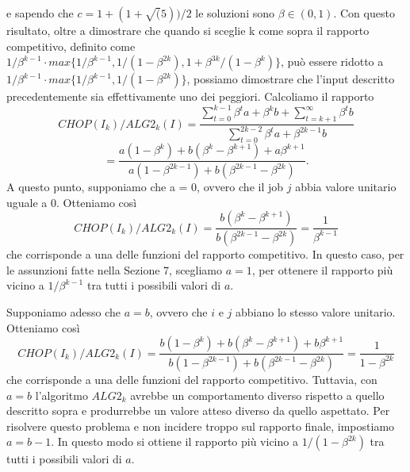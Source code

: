 \documentclass[12pt]{article}
\begin{document}
e sapendo che $c=1 + (1 + \sqrt(5))/2$ le soluzioni sono $\beta \in (0,1)$. Con questo risultato, oltre a dimostrare che quando si sceglie k come sopra il rapporto competitivo, definito come $1/\beta^{k-1} \cdot max \{1 / \beta^{k - 1}, 1 / (1 - \beta^{2k}), 1 + \beta^{3k} / (1 - \beta^{k})\}$, può essere ridotto a $1/\beta^{k-1} \cdot max \{1 / \beta^{k - 1}, 1 / (1 - \beta^{2k})\}$, possiamo dimostrare che l'input  descritto precedentemente sia effettivamente uno dei peggiori. Calcoliamo il rapporto $$CHOP(I_{k}) / ALG2_{k}(I) = \frac{ \sum_{t = 0}^{k-1}\beta^{t}a + \beta^{k} b + \sum_{t=k+1}^{\infty}\beta^{t}b}{\sum_{t=0}^{2k-2}\beta^{t}a + \beta^{2k-1}b}$$ $$= \frac{a(1 - \beta^{k}) + b(\beta^{k} - \beta^{k+1}) + a\beta^{k+1}}{a(1 - \beta^{2k-1}) + b(\beta^{2k-1}-\beta^{2k})}.$$
A questo punto, supponiamo che a = 0, ovvero che il job $j$ abbia valore unitario uguale a 0. Otteniamo così $$CHOP(I_{k}) / ALG2_{k}(I) = \frac{b(\beta^{k} - \beta^{k+1})}{b(\beta^{2k-1}-\beta^{2k})} = \frac{1}{\beta^{k-1}}$$ che corrisponde a una delle funzioni del rapporto competitivo. In questo caso, per le assunzioni fatte nella Sezione 7, scegliamo $a = 1$, per ottenere il rapporto più vicino a $1/\beta^{k-1}$ tra tutti i possibili valori di $a$.

Supponiamo adesso che $a = b$, ovvero che $i$ e $j$ abbiano lo stesso valore unitario. Otteniamo così $$CHOP(I_{k}) / ALG2_{k}(I) = \frac{b(1 - \beta^{k}) + b(\beta^{k} - \beta^{k+1}) + b\beta^{k+1}}{b(1 - \beta^{2k-1}) + b(\beta^{2k-1}-\beta^{2k})} = \frac{1}{1 - \beta^{2k}}$$ che corrisponde a una delle funzioni del rapporto competitivo. Tuttavia, con $a = b$ l'algoritmo $ALG2_{k}$ avrebbe un comportamento diverso rispetto a quello descritto sopra e produrrebbe un valore atteso diverso da quello aspettato. Per risolvere questo problema e non incidere troppo sul rapporto finale, impostiamo $a = b-1$. In questo modo si ottiene il rapporto più vicino a $1/(1 - \beta^{2k})$ tra tutti i possibili valori di $a$.
\end{document}

